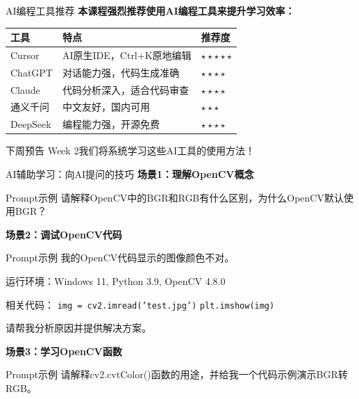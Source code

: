 \documentclass[aspectratio=169, 12pt]{beamer}
\begin{document}
\begin{frame}{AI编程工具推荐}
    \textbf{本课程强烈推荐使用AI编程工具来提升学习效率：}

    \vspace{0.3cm}

    \begin{table}
        \centering
        \small
        \begin{tabular}{lp{4cm}l}
            \toprule
            \textbf{工具} & \textbf{特点} & \textbf{推荐度} \\
            \midrule
            Cursor & AI原生IDE，Ctrl+K原地编辑 & $\star\star\star\star\star$ \\
            ChatGPT & 对话能力强，代码生成准确 & $\star\star\star\star$ \\
            Claude & 代码分析深入，适合代码审查 & $\star\star\star\star$ \\
            通义千问 & 中文友好，国内可用 & $\star\star\star$ \\
            DeepSeek & 编程能力强，开源免费 & $\star\star\star\star$ \\
            \bottomrule
        \end{tabular}
    \end{table}

    \vspace{0.3cm}

    \begin{alertblock}{下周预告}
        Week 2我们将系统学习这些AI工具的使用方法！
    \end{alertblock}
\end{frame}

\begin{frame}{AI辅助学习：向AI提问的技巧}
    \textbf{场景1：理解OpenCV概念}
    \begin{exampleblock}{Prompt示例}
        请解释OpenCV中的BGR和RGB有什么区别，为什么OpenCV默认使用BGR？
    \end{exampleblock}

    \vspace{0.3cm}

    \textbf{场景2：调试OpenCV代码}
    \begin{exampleblock}{Prompt示例}
        我的OpenCV代码显示的图像颜色不对。

        运行环境：Windows 11, Python 3.9, OpenCV 4.8.0

        相关代码：
        \texttt{img = cv2.imread('test.jpg')}
        \texttt{plt.imshow(img)}

        请帮我分析原因并提供解决方案。
    \end{exampleblock}

    \vspace{0.3cm}

    \textbf{场景3：学习OpenCV函数}
    \begin{exampleblock}{Prompt示例}
        请解释cv2.cvtColor()函数的用途，并给我一个代码示例演示BGR转RGB。
    \end{exampleblock}
\end{frame}
\end{document}
